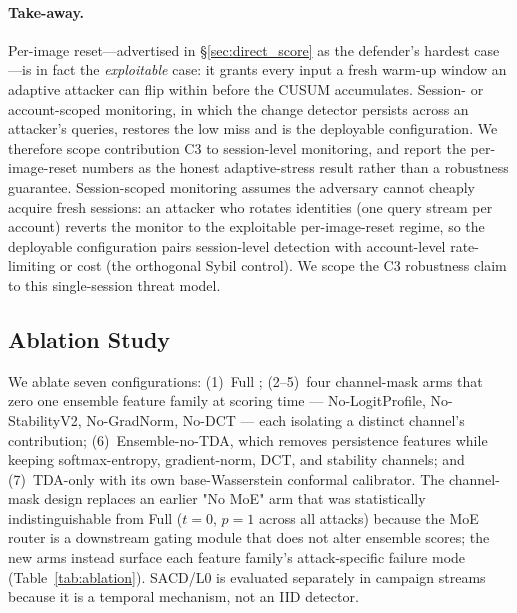 \paragraph{Take-away.} Per-image reset---advertised in \S\ref{sec:direct_score}
as the defender's hardest case---is in fact the \emph{exploitable} case: it
grants every input a fresh warm-up window an adaptive attacker can flip within
before the CUSUM accumulates. Session- or account-scoped monitoring, in which
the change detector persists across an attacker's queries, restores the low
miss and is the deployable configuration. We therefore scope contribution C3 to
session-level monitoring, and report the per-image-reset numbers as the honest
adaptive-stress result rather than a robustness guarantee. Session-scoped
monitoring assumes the adversary cannot cheaply acquire fresh sessions: an
attacker who rotates identities (one query stream per account) reverts the
monitor to the exploitable per-image-reset regime, so the deployable
configuration pairs session-level detection with account-level rate-limiting
or cost (the orthogonal Sybil control). We scope the C3 robustness claim to
this single-session threat model.

\subsection{Ablation Study}
\label{sec:ablation}

We ablate seven configurations:
(1)~Full \prism;
(2--5)~four channel-mask arms that zero one ensemble feature family at
scoring time --- No-LogitProfile, No-StabilityV2, No-GradNorm, No-DCT ---
each isolating a distinct channel's contribution;
(6)~Ensemble-no-TDA, which removes persistence features while keeping
softmax-entropy, gradient-norm, DCT, and stability channels; and
(7)~TDA-only with its own base-Wasserstein conformal calibrator.
The channel-mask design replaces an earlier "No MoE" arm that was
statistically indistinguishable from Full \prism ($t{=}0$, $p{=}1$ across all
attacks) because the MoE router is a downstream gating module that does not
alter ensemble scores; the new arms instead surface each feature family's
attack-specific failure mode (Table~\ref{tab:ablation}). SACD/L0 is
evaluated separately in campaign streams because it is a temporal mechanism,
not an IID detector.


